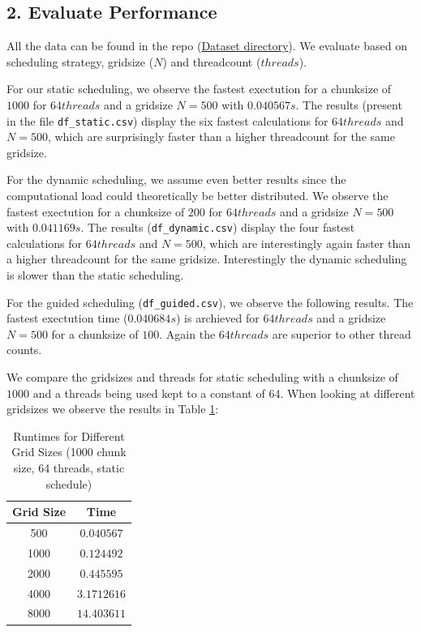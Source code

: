 \documentclass[a4paper,10pt]{article}
\begin{document}
\subsection{2. Evaluate Performance}
All the data can be found in the repo (\href{https://github.com/paulmyr/DD2356-MethodsHPC/tree/master/3_open_mp/exercise5/data}{Dataset directory}).
We evaluate based on scheduling strategy, gridsize ($N$) and threadcount ($threads$).

For our static scheduling, we observe the fastest exectution for a chunksize of $ 1000 $ for $64 threads$ and a gridsize $N=500$ with $0.040567 s$.
The results (present in the file \verb|df_static.csv|) display the six fastest calculations for $64 threads$ and $N=500$, which are surprisingly faster than a higher threadcount for the same gridsize.

For the dynamic scheduling, we assume even better results since the computational load could theoretically be better distributed. 
We observe the fastest exectution for a chunksize of $ 200 $ for $64 threads$ and a gridsize $N=500$ with $0.041169 s$.
The results (\verb|df_dynamic.csv|) display the four fastest calculations for $64 threads$ and $N=500$, which are interestingly again faster than a higher threadcount for the same gridsize.
Interestingly the dynamic scheduling is slower than the static scheduling.

For the guided scheduling (\verb|df_guided.csv|), we observe the following results. The fastest exectution time ($0.040684 s$) is archieved for $64 threads$ and a gridsize $N=500$ for a chunksize of $100$.
Again the $64 threads$ are superior to other thread counts.

We compare the gridsizes and threads for static scheduling with a chunksize of $1000$ and a threads being used kept to a constant of 64. When looking at different gridsizes we observe the results in Table \ref{table:ex5_grid_changes}:

\begin{table}[h!]
\centering
\begin{tabular}{|c|c|}
\hline
\textbf{Grid Size} & \textbf{Time} \\
\hline
500  & $0.040567$  \\
1000 & $0.124492$ \\
2000 & $0.445595$ \\
4000 & $3.1712616$ \\
8000 & $14.403611$ \\
\hline
\end{tabular}
\caption{Runtimes for Different Grid Sizes (1000 chunk size, 64 threads, static schedule)}
\label{table:ex5_grid_changes}
\end{table}
\end{document}
